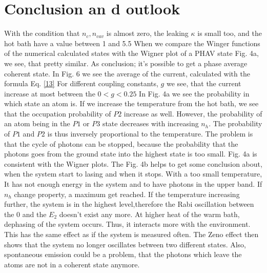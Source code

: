 \documentclass[12pt,a4paper]{article}
\begin{document}
\section{Conclusion an d outlook}
With the condition that $n_c, n_{cav}$ is almost zero, the leaking $\kappa$ is small too, and the hot bath have a value between 1 and 5.5 When we compare the Winger functions of the numerical calculated states with the Wigner plot of a PHAV state Fig. 4a, we see, that pretty similar. As conclusion; it's possible to get a phase average coherent state. 
In Fig. 6 we see the average of the current, calculated with the formula Eq. \eqref{13} For different coupling constants, $g$
we see, that the current increase at most between the $ 0<g<0.25$ 
In Fig. 4a we see the probability in which state an atom is. If we increase the temperature from the hot bath, we see that the occupation probability of $P2$ increase as well. However, the probability of an atom being in the $P1$ or $P3$ state decreases with increasing $n_h$. The probability of $P1$ and $P2$ is thus inversely proportional to the temperature.
The problem is that the cycle of photons can be stopped, because the probability that the photons goes from the ground state into the highest state is too small.
Fig. 4a is consistent with the Wigner plots.
The Fig. 4b helps to get some conclusion about, when the system start to lasing and when it stops. With a too small temperature, It has not enough energy in the system and to have photons in the upper band. If $n_h$ change property, a maximum get reached. If the temperature increasing further, the system is in the highest level,therefore the Rabi oscillation between the 0 and the $E_2$ doesn't exist any more.
At higher heat of the warm bath, dephasing of the system occurs. Thus, it interacts more with the environment. This has the same effect as if the system is measured often. The Zeno effect then shows that the system no longer oscillates between two different states. Also, spontaneous  emission could be a problem, that the photons which leave the atoms are not in a coherent state anymore. \cite{Niedenzu2019}
\cite{Scovil1959}
\printbibliography



\newpage
\end{document}
